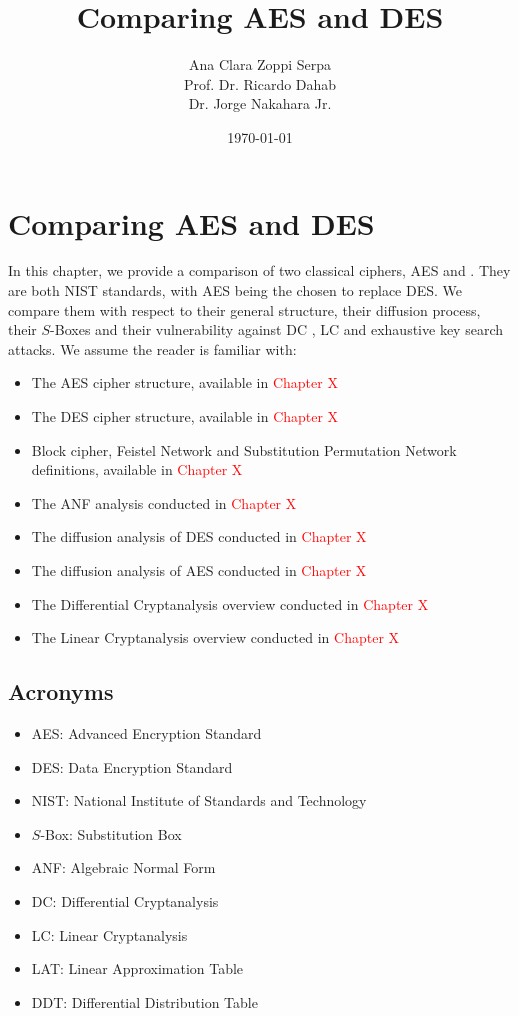 \documentclass{report}
\title{Comparing AES and DES}
\author{Ana Clara Zoppi Serpa\\ Prof. Dr. Ricardo Dahab \\ Dr. Jorge Nakahara Jr.}
\date{\today}
\begin{document}
\maketitle

\tableofcontents

\chapter{Comparing AES and DES}
In this chapter, we provide a comparison of two classical ciphers, AES \cite{AES-FIPS} and \cite{DES-FIPS}. They are both NIST standards, with AES being the chosen to replace DES. We compare them with respect to their general structure, their diffusion process, their $S$-Boxes and their vulnerability against DC \cite{ShamirBook}, LC \cite{Matsui1993LinearCM} and exhaustive key search \cite{DESCracker} attacks. We assume the reader is familiar with:
\begin{itemize}
    \item The AES cipher structure, available in \textcolor{red}{Chapter X}
    \item The DES cipher structure, available in \textcolor{red}{Chapter X}
    \item Block cipher, Feistel Network and Substitution Permutation Network definitions, available in \textcolor{red}{Chapter X}
    \item The ANF analysis conducted in \textcolor{red}{Chapter X}
    \item The diffusion analysis of DES conducted in \textcolor{red}{Chapter X}
    \item The diffusion analysis of AES conducted in \textcolor{red}{Chapter X}
    \item The Differential Cryptanalysis overview conducted in \textcolor{red}{Chapter X}
    \item The Linear Cryptanalysis overview conducted in \textcolor{red}{Chapter X}
\end{itemize}


\section{Acronyms}
\begin{itemize}
    \item AES: Advanced Encryption Standard
    \item DES: Data Encryption Standard
    \item NIST: National Institute of Standards and Technology
    \item $S$-Box: Substitution Box
    \item ANF: Algebraic Normal Form
    \item DC: Differential Cryptanalysis
    \item LC: Linear Cryptanalysis
    \item LAT: Linear Approximation Table
    \item DDT: Differential Distribution Table
\end{itemize}
\end{document}
